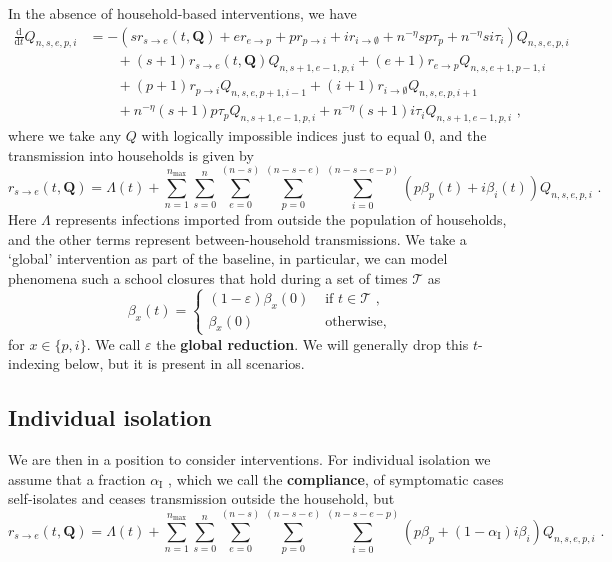 \documentclass[10pt,a4paper]{article}
\newcommand{\be}{\begin{equation}}
\newcommand{\ee}{\end{equation}}
\newcommand{\ba}{\begin{equation} \begin{aligned}}
\newcommand{\ea}{\end{aligned} \end{equation}}
\newcommand{\ddt}[1]{\frac{\mathrm{d}#1}{\mathrm{d}t}}
\begin{document}
In the absence of household-based interventions, we have
\ba
\ddt{}Q_{n,s,e,p,i} & = - \left(s r_{s\rightarrow e}(t,\mathbf{Q}) + e
r_{e\rightarrow p} + p r_{p\rightarrow i} + i r_{i\rightarrow \emptyset} 
+ n^{-\eta}s p \tau_p  + n^{-\eta}s i  \tau_i \right) Q_{n,s,e,p,i}
\\ & \qquad
+ (s+1) r_{s\rightarrow e}(t,\mathbf{Q}) Q_{n,s+1,e-1,p,i}
+ (e+1) r_{e\rightarrow p} Q_{n,s,e+1,p-1,i}
\\ & \qquad
+ (p+1) r_{p\rightarrow i} Q_{n,s,e,p+1,i-1}
+ (i+1) r_{i\rightarrow \emptyset} Q_{n,s,e,p,i+1}
\\ & \qquad
+ n^{-\eta}(s+1) p \tau_p Q_{n,s+1,e-1,p,i}
+ n^{-\eta}(s+1) i \tau_i Q_{n,s+1,e-1,p,i}
\text{ ,}
\ea
where we take any $Q$ with logically impossible indices just to equal $0$,
and the transmission into households is given by
\be
r_{s\rightarrow e}(t,\mathbf{Q}) = \Lambda(t) +
\sum_{n=1}^{n_{\mathrm{max}}}
\sum_{s=0}^{n}
\sum_{e=0}^{(n-s)}
\sum_{p=0}^{(n-s-e)}
\sum_{i=0}^{(n-s-e-p)}
\left(p \beta_p(t) + i \beta_i(t) \right) Q_{n,s,e,p,i}
\text{ .}
\ee
Here $\Lambda$ represents infections imported from outside the population of
households, and the other terms represent between-household transmissions.  We
take a `global' intervention as part of the baseline, in particular, we can
model phenomena such a school closures that hold during a set of times
$\mathcal{T}$ as
\be
\beta_x(t) = \begin{cases} (1-\varepsilon) \beta_x(0) & \text{ if } t \in \mathcal{T}
\text{ ,} \\
\beta_x(0) & \text{ otherwise,} \end{cases}
\ee
for $x \in \{p, i\}$. We call $\varepsilon$ the \textbf{global reduction}. We will
generally drop this $t$-indexing below, but it is present in all scenarios.

\subsection{Individual isolation}

We are then in a position to consider interventions. For individual isolation
we assume that a fraction $\alpha_{\mathrm{I}}$ , which we call the
\textbf{compliance}, of symptomatic cases self-isolates and ceases transmission
outside the household, but 
\be
r_{s\rightarrow e}(t,\mathbf{Q}) = \Lambda(t) +
\sum_{n=1}^{n_{\mathrm{max}}}
\sum_{s=0}^{n}
\sum_{e=0}^{(n-s)}
\sum_{p=0}^{(n-s-e)}
\sum_{i=0}^{(n-s-e-p)}
\left(p \beta_p + (1-\alpha_{\mathrm{I}}) i \beta_i \right) Q_{n,s,e,p,i}
\text{ .}
\ee
\end{document}
